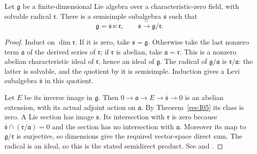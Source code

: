 \begin{theorem}\label{res:I06}
Let \(\mathfrak g\) be a finite-dimensional Lie algebra over a
characteristic-zero field, with solvable radical \(\mathfrak r\).
There is a semisimple subalgebra \(\mathfrak s\) such that
\[
 \mathfrak g=\mathfrak s\ltimes\mathfrak r,\qquad
 \mathfrak s\xrightarrow{\;\sim\;}\mathfrak g/\mathfrak r.
\]
\end{theorem}
\begin{proof}
Induct on \(\dim\mathfrak r\). If it is zero, take \(\mathfrak s=\mathfrak g\).
Otherwise take the last nonzero term \(\mathfrak a\) of the derived
series of \(\mathfrak r\); if \(\mathfrak r\) is abelian, take
\(\mathfrak a=\mathfrak r\). This is a nonzero abelian characteristic
ideal of \(\mathfrak r\), hence an ideal of \(\mathfrak g\).
The radical of \(\mathfrak g/\mathfrak a\) is
\(\mathfrak r/\mathfrak a\): the latter is solvable, and the quotient
by it is semisimple. Induction gives a Levi subalgebra
\(\overline{\mathfrak s}\) in this quotient.

Let \(E\) be its inverse image in \(\mathfrak g\).
Then \(0\to\mathfrak a\to E\to\overline{\mathfrak s}\to0\)
is an abelian extension, with its actual adjoint action on
\(\mathfrak a\). By Theorem~\ref{res:I05} its class is zero.
A Lie section has image \(\mathfrak s\).
Its intersection with \(\mathfrak r\) is zero because
\(\overline{\mathfrak s}\cap(\mathfrak r/\mathfrak a)=0\) and the
section has no intersection with \(\mathfrak a\).
Moreover its map to \(\mathfrak g/\mathfrak r\) is surjective,
so dimensions give the required vector-space direct sum.
The radical is an ideal, so this is the stated semidirect product.
See \cite[Theorem 7.8.13]{weibel} and
\cite[Theorem 48.9]{etingof}.
\end{proof}

